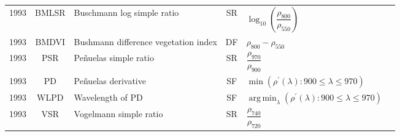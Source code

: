 \documentclass[10pt]{article}
\DeclareMathOperator{\argmin}{arg\,min}
\begin{document}
\begin{ThreePartTable}
\begin{longtable}{c c m{2.3in} c M{2.8in} M{1.5in}}
  1993 & BMLSR   & Buschmann log simple ratio                                                     & SR & $\log_{10}\left(\dfrac{\rho_{800}}{\rho_{550}}\right)$                                                                                                                                                                                                                                  & \citet{Buschmann1993}                               \\
  1993 & BMDVI   & Bushmann difference vegetation index                                           & DF & $\rho_{800}-\rho_{550}$                                                                                                                                                                                                                                                                 & \citet{Buschmann1993}                               \\
  1993 & PSR     & Pe{\~{n}}uelas simple ratio                                                    & SR & $\dfrac{\rho_{970}}{\rho_{900}}$                                                                                                                                                                                                                                                        & \citet{Penuelas1993}                                \\
  1993 & PD      & Pe{\~{n}}uelas derivative                                                      & SF & $\min(\rho^\prime(\lambda):900\le\lambda\le970)$                                                                                                                                                                                                                                        & \citet{Penuelas1993}                                \\
  1993 & WLPD    & Wavelength of PD                                                               & SF & $\argmin_\lambda (\rho^\prime(\lambda):900\le\lambda\le970)$                                                                                                                                                                                                                            & \citet{Penuelas1993}                                \\
  1993 & VSR     & Vogelmann simple ratio                                                         & SR & $\dfrac{\rho_{740}}{\rho_{720}}$                                                                                                                                                                                                                                                        & \citet{Vogelmann1993}                               \\

\end{longtable}
\end{ThreePartTable}
\end{document}
